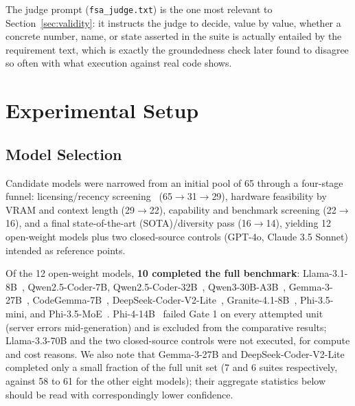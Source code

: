 \documentclass[conference]{IEEEtran}
\begin{document}
The judge prompt (\texttt{fsa\_judge.txt}) is the one most relevant to
Section~\ref{sec:validity}: it instructs the judge to decide, value by value,
whether a concrete number, name, or state asserted in the suite is actually
entailed by the requirement text, which is exactly the groundedness check
later found to disagree so often with what execution against real code shows.

\section{Experimental Setup}
\label{sec:setup}

\subsection{Model Selection}
Candidate models were narrowed from an initial pool of 65 through a
four-stage funnel: licensing/recency screening~\cite{liesenfeld2023opening,white2024mof} (65$\rightarrow$31$\rightarrow$29),
hardware feasibility by VRAM and context length (29$\rightarrow$22), capability
and benchmark screening (22$\rightarrow$16), and a final state-of-the-art
(SOTA)/diversity pass
(16$\rightarrow$14), yielding 12 open-weight models plus two closed-source
controls (GPT-4o, Claude 3.5 Sonnet) intended as reference points.

Of the 12 open-weight models, \textbf{10 completed the full benchmark}:
Llama-3.1-8B~\cite{grattafiori2024llama3}, Qwen2.5-Coder-7B, Qwen2.5-Coder-32B~\cite{hui2024qwen25coder}, Qwen3-30B-A3B~\cite{yang2025qwen3}, Gemma-3-27B~\cite{gemma2025gemma3},
CodeGemma-7B~\cite{codegemma2024}, DeepSeek-Coder-V2-Lite~\cite{deepseek2024coderv2}, Granite-4.1-8B~\cite{granite4}, Phi-3.5-mini, and
Phi-3.5-MoE~\cite{abdin2024phi3}. Phi-4-14B~\cite{abdin2024phi4} failed Gate 1 on every attempted unit (server errors
mid-generation) and is excluded from the comparative results; Llama-3.3-70B
and the two closed-source controls were not executed, for compute and cost
reasons. We also note that Gemma-3-27B and DeepSeek-Coder-V2-Lite completed
only a small fraction of the full unit set (7 and 6 suites respectively,
against 58 to 61 for the other eight models); their aggregate statistics
below should be read with correspondingly lower confidence.
\end{document}
